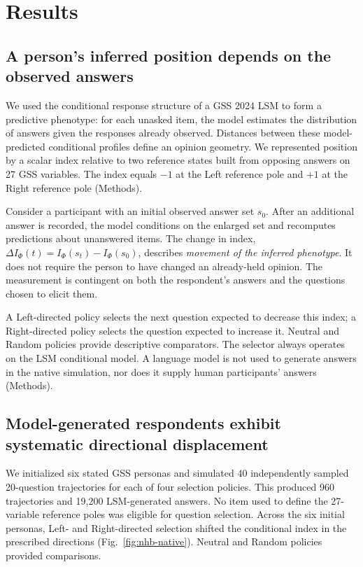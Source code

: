 \documentclass[11pt]{article}
\newcommand{\Ph}{\Phi}
\newcommand{\Iidx}{I_{\Ph}}
\newcommand{\Delt}{\Delta I_{\Ph}}
\begin{document}
\section*{Results}

\subsection*{A person's inferred position depends on the observed answers}
We used the conditional response structure of a GSS 2024 LSM to form a predictive phenotype: for each unasked item, the model estimates the distribution of answers given the responses already observed. Distances between these model-predicted conditional profiles define an opinion geometry. We represented position by a scalar index relative to two reference states built from opposing answers on 27 GSS variables. The index equals $-1$ at the Left reference pole and $+1$ at the Right reference pole (Methods).

Consider a participant with an initial observed answer set $s_0$. After an additional answer is recorded, the model conditions on the enlarged set and recomputes predictions about unanswered items. The change in index, $\Delt(t)=\Iidx(s_t)-\Iidx(s_0)$, describes \emph{movement of the inferred phenotype}. It does not require the person to have changed an already-held opinion. The measurement is contingent on both the respondent's answers and the questions chosen to elicit them.

A Left-directed policy selects the next question expected to decrease this index; a Right-directed policy selects the question expected to increase it. Neutral and Random policies provide descriptive comparators. The selector always operates on the LSM conditional model. A language model is not used to generate answers in the native simulation, nor does it supply human participants' answers (Methods).

\subsection*{Model-generated respondents exhibit systematic directional displacement}
We initialized six stated GSS personas and simulated 40 independently sampled 20-question trajectories for each of four selection policies. This produced 960 trajectories and 19,200 LSM-generated answers. No item used to define the 27-variable reference poles was eligible for question selection. Across the six initial personas, Left- and Right-directed selection shifted the conditional index in the prescribed directions (Fig.~\ref{fig:nhb-native}). Neutral and Random policies provided comparisons.
\end{document}
